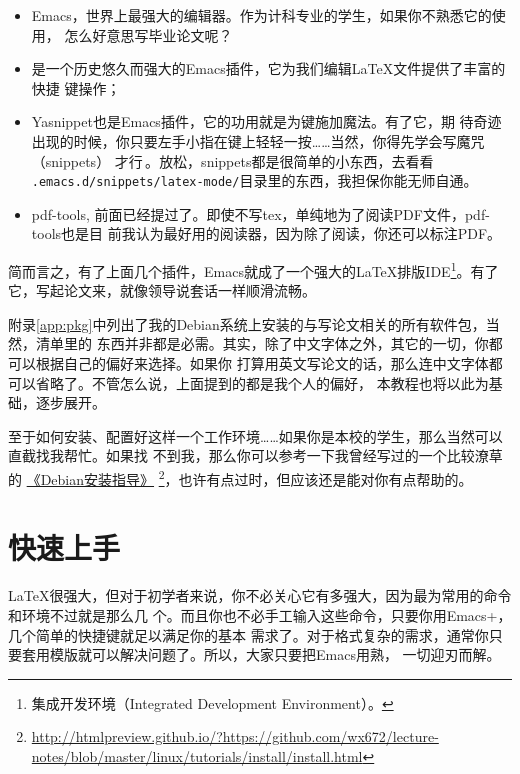\documentclass{swfcthesis}
\begin{document}
\begin{description}
  \begin{itemize}
  \item Emacs，世界上最强大的编辑器。\cite{emacs}作为计科专业的学生，如果你不熟悉它的使用，
    怎么好意思写毕业论文呢？
  \item \auctex{}是一个历史悠久而强大的Emacs插件，它为我们编辑\LaTeX{}文件提供了丰富的快捷
    键操作；\cite{auctex}
  \item Yasnippet也是Emacs插件，它的功用就是为\Tab{}键施加魔法。\cite{yasnippet}有了它，期
    待奇迹出现的时候，你只要左手小指在\Tab{}键上轻轻一按……当然，你得先学会写魔咒（snippets）
    才行\,\Frowny{}。\label{p:yasnippet}放松，snippets都是很简单的小东西，去看看
    \texttt{.emacs.d/snippets/latex-mode/}目录里的东西，我担保你能无师自通。
  \item pdf-tools, 前面已经提过了。即使不写tex，单纯地为了阅读PDF文件，pdf-tools也是目
    前我认为最好用的阅读器，因为除了阅读，你还可以标注PDF。    
  \end{itemize}

  简而言之，有了上面几个插件，Emacs就成了一个强大的\LaTeX{}排版IDE\footnote{集成开发环境（Integrated
    Development Environment）。}。有了它，写起论文来，就像领导说套话一样顺滑流畅。
\end{description}

附录\ref{app:pkg}中列出了我的Debian系统上安装的与写论文相关的所有软件包，当然，清单里的
东西并非都是必需。其实，除了中文字体之外，其它的一切，你都可以根据自己的偏好来选择。如果你
打算用英文写论文的话，那么连中文字体都可以省略了。不管怎么说，上面提到的都是我个人的偏好，
本教程也将以此为基础，逐步展开。

至于如何安装、配置好这样一个工作环境……如果你是本校的学生，那么当然可以直截找我帮忙。如果找
不到我，那么你可以参考一下我曾经写过的一个比较潦草的%
\href{http://htmlpreview.github.io/?https://github.com/wx672/lecture-notes/blob/master/linux/tutorials/install/install.html}{《Debian安装指导》}%
\footnote{\url{http://htmlpreview.github.io/?https://github.com/wx672/lecture-notes/blob/master/linux/tutorials/install/install.html}}，也许有点过时，但应该还是能对你有点帮助的。

\chapter{快速上手}

\LaTeX{}很强大，但对于初学者来说，你不必关心它有多强大，因为最为常用的命令和环境不过就是那么几
个。而且你也不必手工输入这些命令，只要你用Emacs+\auctex{}，几个简单的快捷键就足以满足你的基本
需求了。对于格式复杂的需求，通常你只要套用模版就可以解决问题了。所以，大家只要把Emacs用熟，
一切迎刃而解。
\end{document}
